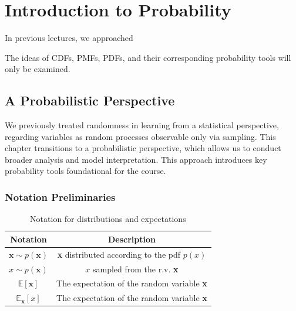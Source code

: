 \chapter{Introduction to Probability}

In previous lectures, we approached


The ideas of CDFs, PMFs, PDFs, and their corresponding probability tools will only be examined.

\section{A Probabilistic Perspective}

We previously treated randomness in learning from a statistical perspective, regarding variables as random processes observable only via sampling. This chapter transitions to a probabilistic perspective, which allows us to conduct broader analysis and model interpretation. This approach introduces key probability tools foundational for the course.
\subsection{Notation Preliminaries}

\begin{table}[h!]
    \centering
    \begin{tabular}{cc}
        \toprule
        \textbf{Notation}        & \textbf{Description}                               \\
        \midrule
        $\bm{x} \sim p(\bm{x})$  & \textbf{x} distributed according to the pdf $p(x)$ \\
        $x \sim p(\bm{x})$       & $x$ sampled from the r.v. \textbf{x}               \\
        $\mathbb{E}[\bm{x}]$     & The expectation of the random variable \textbf{x}  \\
        $\mathbb{E}_{\bm{x}}[x]$ & The expectation of the random variable \textbf{x}  \\
        \bottomrule
    \end{tabular}
    \caption{Notation for distributions and expectations}
\end{table}

